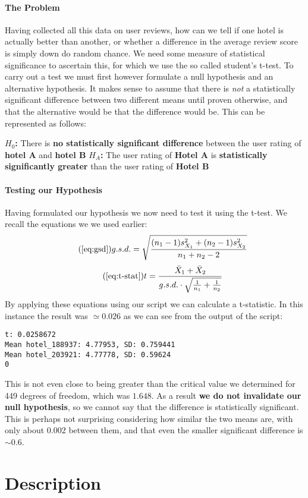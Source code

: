 \documentclass[10pt]{article}
\begin{document}
\paragraph{The Problem}
Having collected all this data on user reviews, how can we tell if one hotel is actually better than another, or whether a difference in the average review score is simply down do random chance. We need some measure of statistical significance to ascertain this, for which we use the so called student's t-test. To carry out a test we must first however formulate a null hypothesis and an alternative hypothesis. 
It makes sense to assume that there is \textit{not} a statistically significant difference between two different means until proven otherwise, and that the alternative would be that the difference would be. This can be represented as follows:
\begin{flushleft}
\textbf{$H_{0}$:}		There is \textbf{no statistically significant difference} between the user rating of \textbf{hotel A} and \textbf{hotel B}
\linebreak
\textbf{$H_{A}$:}		The user rating of \textbf{Hotel A} is \textbf{statistically significantly greater} than the user rating of \textbf{Hotel B}
\end{flushleft}
\paragraph{Testing our Hypothesis}
Having formulated our hypothesis we now need to test it using the t-test. We recall the equations we we used earlier:
\begin{equation*} \tag{\ref{eq:gsd}}
g.s.d. = \sqrt{\frac{(n_{1}-1)s^{2}_{X_1} + (n_{2}-1)s^{2}_{X_2}}{n_{1} + n_{2} - 2}} 
\end{equation*} 
\begin{equation*}  \tag{\ref{eq:t-stat}}
t = \frac{\bar{X}_1+\bar{X}_2}{g.s.d. \cdot \sqrt{\frac{1}{n_1} + \frac{1}{n_2}}}
\end{equation*}
By applying these equations using our script we can calculate a t-statistic. In this instance the result was $\simeq 0.026$ as we can see from the output of the script:
\begin{lstlisting}
t: 0.0258672
Mean hotel_188937: 4.77953, SD: 0.759441
Mean hotel_203921: 4.77778, SD: 0.59624
0
\end{lstlisting}
This is not even close to being greater than the critical value we determined for 449 degrees of freedom, which was $1.648$. As a result \textbf{we do not invalidate our null hypothesis}, so we cannot say that the difference is statistically significant. This is perhaps not surprising considering how similar the two means are, with only about $0.002$ between them, and that even the smaller significant difference is $\sim0.6$. 
\section{Description}
\end{document}
